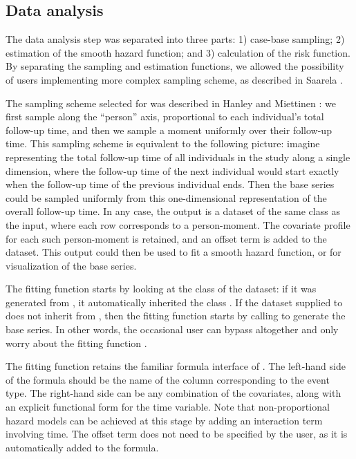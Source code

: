 \documentclass[article]{jss}
\begin{document}
\subsection{Data analysis}\label{data-analysis}

The data analysis step was separated into three parts: 1) case-base
sampling; 2) estimation of the smooth hazard function; and 3)
calculation of the risk function. By separating the sampling and
estimation functions, we allowed the possibility of users implementing
more complex sampling scheme, as described in Saarela
\citeyearpar{saarela2016case}.

The sampling scheme selected for  was described in
Hanley and Miettinen \citeyearpar{hanley2009fitting}: we first sample
along the ``person'' axis, proportional to each individual's total
follow-up time, and then we sample a moment uniformly over their
follow-up time. This sampling scheme is equivalent to the following
picture: imagine representing the total follow-up time of all
individuals in the study along a single dimension, where the follow-up
time of the next individual would start exactly when the follow-up time
of the previous individual ends. Then the base series could be sampled
uniformly from this one-dimensional representation of the overall
follow-up time. In any case, the output is a dataset of the same class
as the input, where each row corresponds to a person-moment. The
covariate profile for each such person-moment is retained, and an offset
term is added to the dataset. This output could then be used to fit a
smooth hazard function, or for visualization of the base series.

The fitting function  starts by looking at the
class of the dataset: if it was generated from , it
automatically inherited the class . If the dataset supplied
to  does not inherit from , then the
fitting function starts by calling  to generate the
base series. In other words, the occasional user can bypass
 altogether and only worry about the fitting
function .

The fitting function retains the familiar formula interface of
. The left-hand side of the formula should be the name of the
column corresponding to the event type. The right-hand side can be any
combination of the covariates, along with an explicit functional form
for the time variable. Note that non-proportional hazard models can be
achieved at this stage by adding an interaction term involving time. The
offset term does not need to be specified by the user, as it is
automatically added to the formula.
\end{document}

